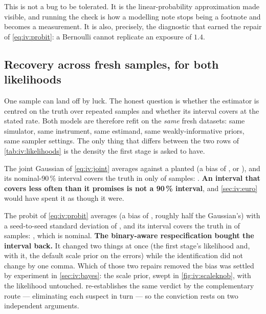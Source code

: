 

This is not a bug to be tolerated. It is the linear-probability approximation made visible, and
running the check is how a modelling note stops being a footnote and becomes a measurement. It is
also, precisely, the diagnostic that earned the repair of \cref{eq:iv:probit}: a Bernoulli cannot
replicate an exposure of $1.4$.

\subsection*{Recovery across fresh samples, for both likelihoods}

One sample can land off by luck. The honest question is whether the estimator is centred on the
truth over repeated samples and whether its interval covers at the stated rate. Both models are
therefore refit on the \emph{same} \nbElevenNSeeds{} fresh datasets: same simulator, same
instrument, same estimand, same weakly-informative priors, same sampler settings. The only thing that
differs between the two rows of \cref{tab:iv:likelihoods} is the density the first stage is asked to
have.



The joint Gaussian of \cref{eq:iv:joint} averages \eur{\nbElevenGaussSeedMean} against a planted
\eur{\nbElevenTrue} (a bias of \eur{\nbElevenGaussSeedBias}, or \pc{\nbElevenGaussSeedBiasPct}),
and its nominal-90\,\% interval covers the truth in only \nbElevenGaussSeedCovN{} of
\nbElevenNSeeds{} samples: \pc{\nbElevenGaussSeedCovPct}. \textbf{An interval that covers less often
than it promises is not a 90\,\% interval}, and \cref{sec:iv:euro} would have spent it as though it
were.

The probit of \cref{eq:iv:probit} averages \eur{\nbElevenSeedMean} (a bias of
\eur{\nbElevenSeedBias}, roughly half the Gaussian's) with a seed-to-seed standard deviation of
\eur{\nbElevenSeedSd}, and its interval covers the truth in \nbElevenSeedCovN{} of \nbElevenNSeeds{}
samples: \pc{\nbElevenSeedCovPct}, which is nominal. \textbf{The binary-aware respecification bought
the interval back.} It changed two things at once (the first stage's likelihood and, with it, the
default scale prior on the errors) while the identification did not change by one comma. Which of
those two repairs removed the bias was settled by experiment in \cref{sec:iv:bayes}: the scale
prior, swept in \cref{fig:iv:scaleknob}, with the likelihood untouched.
 re-establishes the same verdict by the complementary route --- eliminating
each suspect in turn --- so the conviction rests on two independent arguments.

